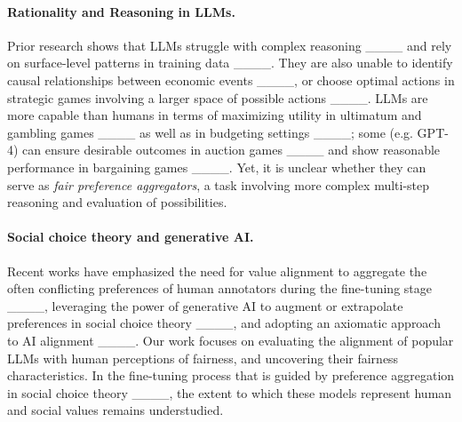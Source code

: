 \paragraph{Rationality and Reasoning in LLMs.} Prior research shows that LLMs struggle with complex reasoning ____ and rely on surface-level patterns in training data ____. They are also unable to identify causal relationships between economic events ____, 
or choose optimal actions in strategic games involving a larger space of possible actions ____. %
LLMs are more capable than humans in terms of maximizing utility in ultimatum and gambling games ____ as well as in budgeting settings ____; some  (e.g. GPT-4) can ensure desirable outcomes in auction games ____ and show reasonable performance in bargaining games ____. 
Yet, it is unclear whether they can serve as \textit{fair preference aggregators}, a task involving more complex multi-step reasoning and evaluation of possibilities. %


\paragraph{Social choice theory and generative AI.} 
Recent works have emphasized the need for value alignment to aggregate the often conflicting preferences of human annotators during the fine-tuning stage ____, leveraging the power of generative AI to augment or extrapolate preferences in social choice theory ____, and adopting an axiomatic approach to AI alignment ____.
Our work focuses on evaluating the alignment of popular LLMs with human perceptions of fairness, and uncovering their fairness characteristics.
In the fine-tuning process that is guided by preference aggregation in social choice theory ____, the extent to which these models represent human and social values remains understudied.